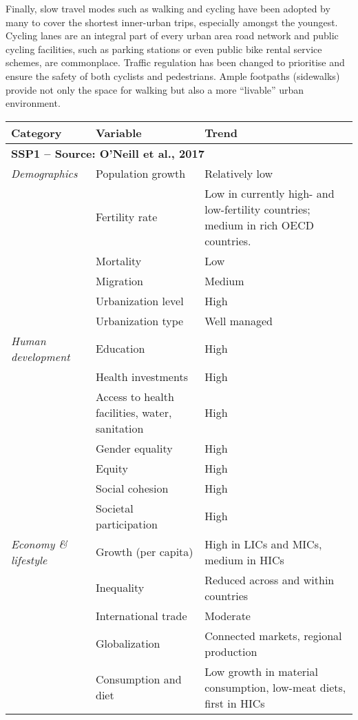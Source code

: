 {Finally, slow travel modes such as walking and cycling have been adopted by many to cover the shortest inner-urban trips, especially amongst the youngest. Cycling lanes are an integral part of every urban area road network and public cycling facilities, such as parking stations or even public bike rental service schemes, are commonplace. Traffic regulation has been changed to prioritise and ensure the safety of both cyclists and pedestrians. Ample footpaths (sidewalks) provide not only the space for walking but also a more ``livable'' urban environment.
}

{\scriptsize
\begin{longtable}{p{3cm}p{3.5cm}p{8cm}}
\toprule
Category & Variable & Trend \\ \midrule
\multicolumn{3}{l}{\textbf{SSP1 -- Source: O'Neill et al., 2017}}\\
\textit{Demographics} & Population growth & Relatively low\\
\textit{} & Fertility rate & Low in currently high- and low-fertility countries; medium in rich OECD countries.\\
\textit{} & Mortality & Low\\
\textit{} & Migration & Medium\\
\textit{} & Urbanization level & High\\
\textit{} & Urbanization type & Well managed\\
\textit{Human development} & Education & High\\
\textit{} & Health investments & High\\
\textit{} & Access to health facilities, water, sanitation & High\\
\textit{} & Gender equality & High\\
\textit{} & Equity & High\\
\textit{} & Social cohesion & High\\
\textit{} & Societal participation & High\\
\textit{Economy \& lifestyle} & Growth (per capita) & High in LICs and MICs, medium in HICs\\
\textit{} & Inequality & Reduced across and within countries\\
\textit{} & International trade & Moderate\\
\textit{} & Globalization & Connected markets, regional production\\
\textit{} & Consumption and diet & Low growth in material consumption, low-meat diets, first in HICs\\

\end{longtable}}
